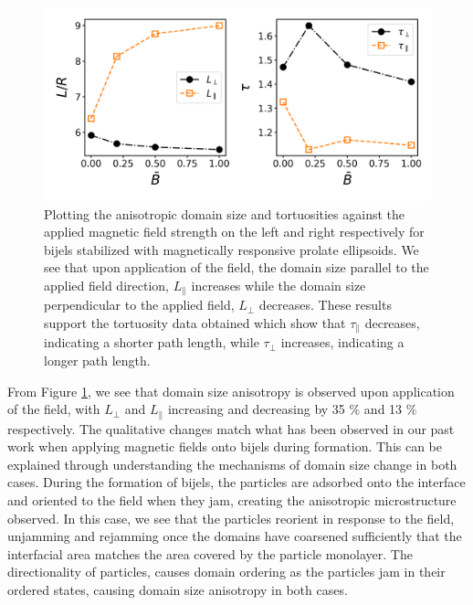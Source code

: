 \begin{figure} 
    \centering 
    \includegraphics[width=\columnwidth]{../figures/results/paper2/domain_size_aniso-field_on.png} 
    \caption{Plotting the anisotropic domain size and tortuosities against the applied magnetic field strength on 
             the left and right respectively for bijels stabilized with magnetically responsive prolate ellipsoids. 
             We see that upon application of the field, the domain size parallel to the applied field direction, 
             $L_{\parallel}$ increases while the domain size perpendicular to the applied field, $L_{\perp}$ decreases.
             These results support the tortuosity data obtained which show that $\tau_{\parallel}$ decreases, 
             indicating a shorter path length, while $\tau_{\perp}$ increases, indicating a longer path length.} 
    \label{fig:domain_size_aniso-field_on} 
\end{figure}

From Figure \ref{fig:domain_size_aniso-field_on}, we see that domain size anisotropy is observed upon application of the field, with $L_{\perp}$ and $L_{\parallel}$ increasing and decreasing by 35 $\%$ and 13 $\%$ respectively. The qualitative changes match what has been observed in our past work when applying magnetic fields onto bijels during formation. \cite{karthikeyan_formation_2024} This can be explained through understanding the mechanisms of domain size change in both cases. During the formation of bijels, the particles are adsorbed onto the interface and oriented to the field when they jam, creating the anisotropic microstructure observed. In this case, we see that the particles reorient in response to the field, unjamming and rejamming once the domains have coarsened sufficiently that the interfacial area matches the area covered by the particle monolayer. The directionality of particles, causes domain ordering as the particles jam in their ordered states, causing domain size anisotropy in both cases.

